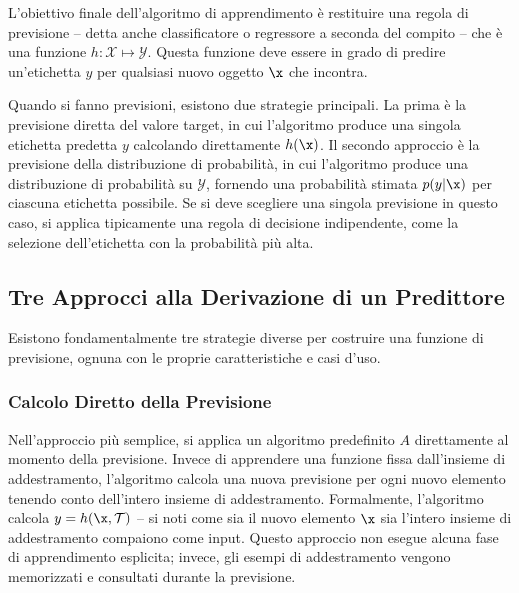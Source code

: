L'obiettivo finale dell'algoritmo di apprendimento è restituire una \alert{regola di previsione} -- detta anche \alert{classificatore} o \alert{regressore} a seconda del compito -- che è una funzione $h: \mathcal{X} \mapsto \mathcal{Y}$. Questa funzione deve essere in grado di predire un'etichetta $y$ per qualsiasi nuovo oggetto $\x$ che incontra.

Quando si fanno previsioni, esistono due strategie principali. La prima è la \alert{previsione diretta del valore target}, in cui l'algoritmo produce una singola etichetta predetta $y$ calcolando direttamente $h(\x)$. Il secondo approccio è la \alert{previsione della distribuzione di probabilità}, in cui l'algoritmo produce una distribuzione di probabilità su $\mathcal{Y}$, fornendo una probabilità stimata $p(y|\x)$ per ciascuna etichetta possibile. Se si deve scegliere una singola previsione in questo caso, si applica tipicamente una regola di decisione indipendente, come la selezione dell'etichetta con la probabilità più alta.

\subsection*{Tre Approcci alla Derivazione di un Predittore}

Esistono fondamentalmente tre strategie diverse per costruire una funzione di previsione, ognuna con le proprie caratteristiche e casi d'uso.

\subsubsection*{Calcolo Diretto della Previsione}

Nell'approccio più semplice, si applica un algoritmo predefinito $A$ direttamente al momento della previsione. Invece di apprendere una funzione fissa dall'insieme di addestramento, l'algoritmo calcola una nuova previsione per ogni nuovo elemento tenendo conto dell'intero insieme di addestramento. Formalmente, l'algoritmo calcola $y = h(\x, \mathcal{T})$ -- si noti come sia il nuovo elemento $\x$ sia l'intero insieme di addestramento compaiono come input. Questo approccio non esegue alcuna fase di apprendimento esplicita; invece, gli esempi di addestramento vengono memorizzati e consultati durante la previsione.

